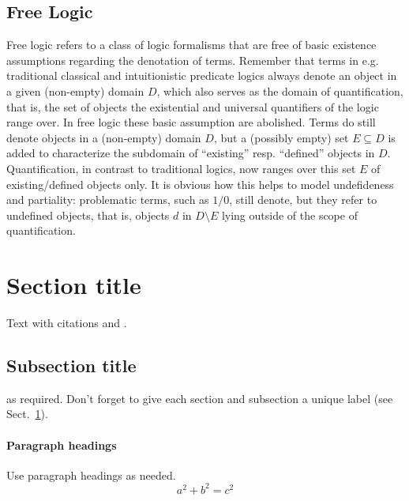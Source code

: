 \subsection{Free Logic}
Free logic \cite{Lambert60,Scottt} refers to a class of logic
formalisms that are free of basic existence assumptions regarding the
denotation of terms. Remember that terms in e.g. traditional classical
and intuitionistic predicate logics always denote an object in a given
(non-empty) domain $D$, which also serves as the domain of
quantification, that is, the set of objects the existential and
universal quantifiers of the logic range over. In free logic these
basic assumption are abolished. Terms do still denote objects in a
(non-empty) domain $D$, but a (possibly empty) set $E\subseteq D$ is
added to characterize the subdomain of ``existing'' resp. ``defined''
objects in $D$. Quantification, in contrast to traditional logics, now
ranges over this set $E$ of existing/defined objects only. It is
obvious how this helps to model undefideness and partiality:
problematic terms, such as $1/0$, still denote, but they refer to
undefined objects, that is, objects $d$ in $D\setminus E$ lying
outside of the scope of quantification.


\section{Section title}
\label{sec:1}
Text with citations \cite{RefB} and \cite{RefJ}.
\subsection{Subsection title}
\label{sec:2}
as required. Don't forget to give each section
and subsection a unique label (see Sect.~\ref{sec:1}).
\paragraph{Paragraph headings} Use paragraph headings as needed.
\begin{equation}
a^2+b^2=c^2
\end{equation}

